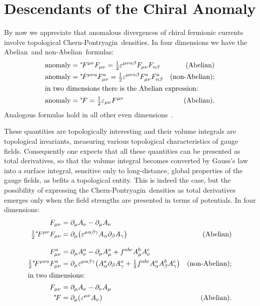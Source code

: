\documentclass[a4paper,12pt,twoside]{article}
\newcommand{\fract}[2]{{\textstyle\frac{#1}{#2}}}
\newcommand{\nA}{non-Abelian}
\newcommand{\Ab}{Abelian}
\newcommand{\CPt}{Chern-Pontryagin}
\newcommand{\mn}{{\mu\nu}}
\newcommand{\ab}{{\alpha\beta}}
\newcommand{\pp}[1]{\partial_{#1}}
\let\eps\varepsilon
\begin{document}
\section{Descendants of the Chiral Anomaly}

By now we appreciate that anomalous divergences of chiral fermionic currents
involve topological \CPt\ densities. In four dimensions we have the \Ab\ and
\nA\ formulas:
\begin{align}
\mbox{anomaly}&= {}^*\!F^{\mn} F_\mn = 
\fract12 \eps^{\mn\ab} F_\mn F_\ab 
&\mbox{(\Ab)}\label{eq-1}\\
\mbox{anomaly}&= {}^*\!F^{\mn a} F_\mn^a  =  
\fract12 \eps^{\mn\ab} F_\mn^a   F_\ab^a    &\mbox{(\nA);}
\label{eq-2}\\
\intertext{in two dimensions there is the \Ab\ expression:}
\mbox{anomaly}&= {}^*\!F = \fract12 \eps_\mn F^\mn  &\mbox{(\Ab).}\label{eq-3}
\end{align}
Analogous formulas hold in all other even dimensions~\cite{ref6}.

These quantities are topologically interesting and their volume integrals are
topological invariants, measuring various topological characteristics of gauge fields.
Consequently one expects that all these quantities can be presented as total
derivatives, so that the volume integral becomes converted by Gauss's law into a
surface integral, sensitive only to long-distance, global properties of the gauge fields,
as befits a topological entity. This is indeed the case, but the possibility of expressing
the \CPt\ densities as total derivatives emerges only when the field strengths are
presented in terms of potentials. In four dimensions:
\begin{align}
F_\mn &= \pp\mu A_\nu - \pp \mu A_\nu\nonumber\\
\fract12 {}^*\!F^\mn F_\mn  &= \pp \mu \bigl(\eps^{\mu\alpha\beta\gamma}
A_\alpha \pp\beta A_\gamma \bigr) & \mbox{(\Ab)}\label{eq-4}\\[2ex]
F_\mn^a &= \pp\mu A_\nu^a - \pp \mu A_\mu^a + f^{abc}
A_\mu^b A_\nu^c\nonumber\\
\fract12 {}^*\!F^{\mn a} F_\mn^a  &= \pp\mu \eps^{\mu\alpha\beta\gamma}
\bigl( A_\alpha^a\pp\beta A_\gamma^a + \fract13 f^{abc} A_\alpha^a A_\beta^b
A_\gamma^c
\bigr)& \mbox{(\nA);} \label{eq-5}\\
\intertext{in two dimensions:}
F_\mn &= \pp\mu A_\nu -\pp\nu  A_\mu\nonumber\\
 {}^*\!F &= \pp\mu (\eps^\mn A_\nu) & \mbox{(\Ab).} \label{eq-6}
\end{align}
\end{document}

